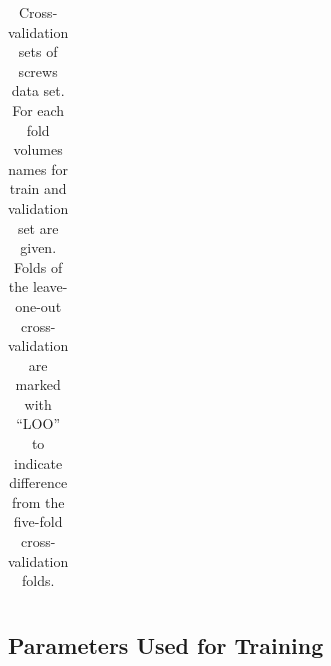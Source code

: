 \begin{table}[!htb]
\begin{tabular}{|c|p{}|p{}|}
    \end{tabular}
    \caption[Cross-validation Sets of Screws Data Set]{Cross-validation sets of screws data set. For each fold volumes names for train and validation set are given. Folds of the leave-one-out cross-validation are marked with ``LOO'' to indicate difference from the five-fold cross-validation folds.} %
    \label{tab:folds-screws}
\end{table}

\clearpage
\subsection{Parameters Used for Training}
